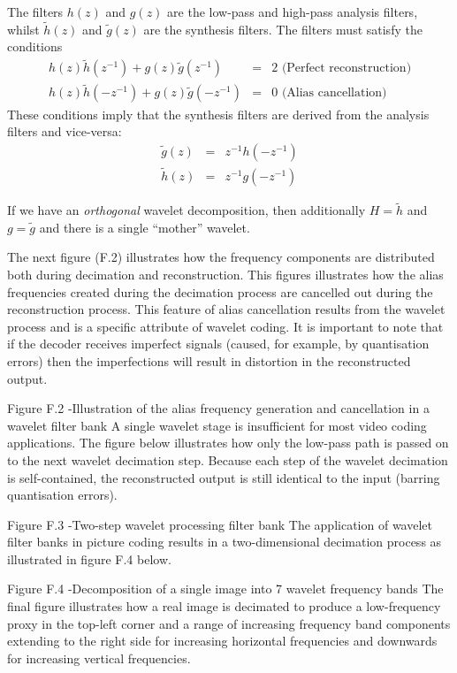 \begin{informative*}
The filters $h(z)$ and $g(z)$ are the low-pass and high-pass analysis 
filters, whilst $\tilde{h}(z)$ and $\tilde{g}(z)$ are the 
synthesis filters. The filters must satisfy the conditions
\begin{eqnarray*}
h(z)\tilde{h}(z^{-1})+g(z)\tilde{g}(z^{-1}) & = & 2 \text{ (Perfect reconstruction)}\\
h(z)\tilde{h}(-z^{-1})+g(z)\tilde{g}(-z^{-1}) & = & 0 \text{ (Alias cancellation)}
\end{eqnarray*}
These conditions imply that the synthesis filters are derived from the analysis filters and vice-versa:
\begin{eqnarray*}
\tilde{g}(z) & = & z^{-1}h(-z^{-1}) \\
\tilde{h}(z) & = & z^{-1}g(-z^{-1})
\end{eqnarray*}

If we have an {\em orthogonal} wavelet decomposition, then additionally $H=\tilde{h}$ and $g=\tilde{g}$
and there is a single ``mother'' wavelet.
 
The next figure (F.2) illustrates how the frequency components are distributed both during decimation and reconstruction. This figures illustrates how the alias frequencies created during the decimation process are cancelled out during the reconstruction process. This feature of alias cancellation results from the wavelet process and is a specific attribute of wavelet coding. It is important to note that if the decoder receives imperfect signals (caused, for example, by quantisation errors) then the imperfections will result in distortion in the reconstructed output.

 
Figure F.2 -Illustration of the alias frequency generation and cancellation in a wavelet filter bank
A single wavelet stage is insufficient for most video coding applications. The figure below illustrates how only the low-pass path is passed on to the next wavelet decimation step. Because each step of the wavelet decimation is self-contained, the reconstructed output is still identical to the input (barring quantisation errors).
 
Figure F.3 -Two-step wavelet processing filter bank
The application of wavelet filter banks in picture coding results in a two-dimensional decimation process as illustrated in figure F.4 below.
 
Figure F.4 -Decomposition of a single image into 7 wavelet frequency bands
The final figure illustrates how a real image is decimated to produce a low-frequency proxy in the top-left corner and a range of increasing frequency band components extending to the right side for increasing horizontal frequencies and downwards for increasing vertical frequencies.
 

\end{informative*}
